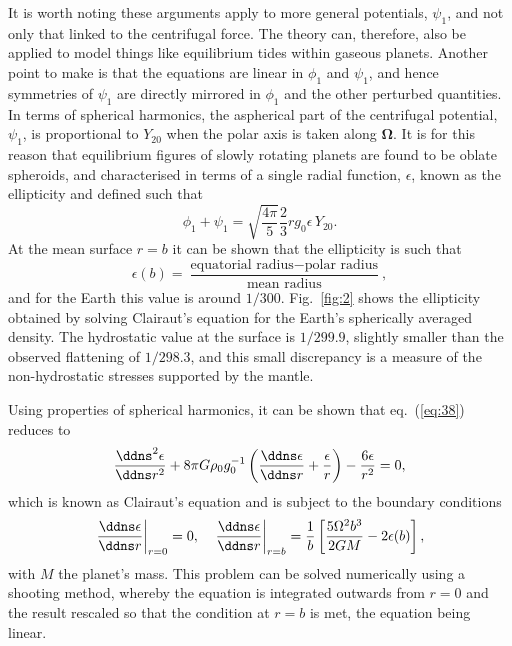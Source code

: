 It is worth noting these arguments apply to more general potentials, $\psi_{1}$, and not only that linked to the 
centrifugal force. The theory can, therefore, also be applied to model things like equilibrium tides within gaseous planets.
 Another point to make is that the equations are linear in $\phi_{1}$ and $\psi_{1}$, and hence symmetries of $\psi_{1}$ are 
 directly mirrored in $\phi_{1}$ and the other perturbed quantities. In terms of spherical harmonics, the aspherical 
 part of the centrifugal potential, $\psi_{1}$, is proportional to $Y_{20}$ when the polar axis is taken along $\bm{\Omega}$. It is for this reason that 
 equilibrium figures of slowly rotating planets are found to be oblate spheroids, and characterised in terms of a single 
 radial function, $\epsilon$, known as the ellipticity and defined such that
\begin{equation}
\phi_{1}+\psi_{1}=\sqrt{\frac{4\pi}{5}}\frac{2}{3}rg_{0}\epsilon\,Y_{20}.
\label{eq:40}
\end{equation}
At the mean surface $r=b$ it can be shown that the ellipticity is such that
\begin{equation}
\epsilon(b)=\frac{\text{equatorial radius}-\text{polar radius}}{\text{mean radius}},
\label{eq:41}
\end{equation}
and for the Earth this value is around $1/300$. Fig.~\ref{fig:2} shows the ellipticity obtained by solving Clairaut's equation 
for the Earth's spherically averaged density. The hydrostatic value at the surface is $1/299.9$, slightly smaller 
than the observed flattening of $1/298.3$, and this small discrepancy is a measure of the non-hydrostatic stresses supported 
by the mantle.

Using properties of spherical harmonics, it can be shown that eq.~(\ref{eq:38}) reduces to
\begin{equation}
\frac{\ddns^{2}\epsilon}{\ddns r^{2}}+8\pi G\rho_{0}g_{0}^{-1}\left(\frac{\ddns \epsilon}{\ddns r}+\frac{\epsilon}{r}\right)-\frac{6\epsilon}{r^{2}}=0,
\label{eq:42}
\end{equation}
which is known as Clairaut's equation and is subject to the boundary conditions
\begin{equation}
\left.\frac{\ddns \epsilon}{\ddns r}\right|_{r=0}=0, \quad \left.\frac{\ddns \epsilon}{\ddns r}\right|_{r=b}=\frac{1}{b}\left[\frac{5\Omega^{2}b^{3}}{2GM}-2\epsilon(b)\right],
\label{eq:43}
\end{equation}
with $M$ the planet's mass. This problem can be solved numerically using a shooting method, whereby the equation is 
integrated outwards from $r=0$ and the result rescaled so that the condition at $r=b$ is met, the equation being linear. 



